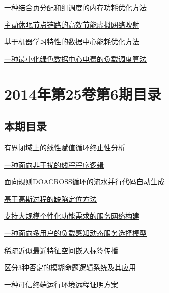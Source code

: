\documentclass[a4paper]{article}
\begin{document}
\href{http://www.jos.org.cn/ch/reader/download_pdf.aspx?file_no=4600&year_id=2014&quarter_id=7&falg=1}{一种结合页分配和组调度的内存功耗优化方法}

\href{http://www.jos.org.cn/ch/reader/download_pdf.aspx?file_no=4603&year_id=2014&quarter_id=7&falg=1}{主动休眠节点链路的高效节能虚拟网络映射}

\href{http://www.jos.org.cn/ch/reader/download_pdf.aspx?file_no=4601&year_id=2014&quarter_id=7&falg=1}{基于机器学习特性的数据中心能耗优化方法}

\href{http://www.jos.org.cn/ch/reader/download_pdf.aspx?file_no=4599&year_id=2014&quarter_id=7&falg=1}{一种最小化绿色数据中心电费的负载调度算法}


\section{\textbf{2014年第25卷第6期目录}}
\subsection{本期目录}
\href{http://www.jos.org.cn/ch/reader/download_pdf.aspx?file_no=4427&year_id=2014&quarter_id=6&falg=1}{有界闭域上的线性赋值循环终止性分析}

\href{http://www.jos.org.cn/ch/reader/download_pdf.aspx?file_no=4429&year_id=2014&quarter_id=6&falg=1}{一种面向非干扰的线程程序逻辑}

\href{http://www.jos.org.cn/ch/reader/download_pdf.aspx?file_no=4425&year_id=2014&quarter_id=6&falg=1}{面向规则DOACROSS循环的流水并行代码自动生成}

\href{http://www.jos.org.cn/ch/reader/download_pdf.aspx?file_no=4430&year_id=2014&quarter_id=6&falg=1}{基于高斯过程的缺陷定位方法}

\href{http://www.jos.org.cn/ch/reader/download_pdf.aspx?file_no=4440&year_id=2014&quarter_id=6&falg=1}{支持大规模个性化功能需求的服务网络构建}

\href{http://www.jos.org.cn/ch/reader/download_pdf.aspx?file_no=4456&year_id=2014&quarter_id=6&falg=1}{一种面向多用户的负载感知动态服务选择模型}

\href{http://www.jos.org.cn/ch/reader/download_pdf.aspx?file_no=4556&year_id=2014&quarter_id=6&falg=1}{稀疏近似最近特征空间嵌入标签传播}

\href{http://www.jos.org.cn/ch/reader/download_pdf.aspx?file_no=4560&year_id=2014&quarter_id=6&falg=1}{区分3种否定的模糊命题逻辑系统及其应用}

\href{http://www.jos.org.cn/ch/reader/download_pdf.aspx?file_no=4414&year_id=2014&quarter_id=6&falg=1}{一种可信终端运行环境远程证明方案}
\end{document}
